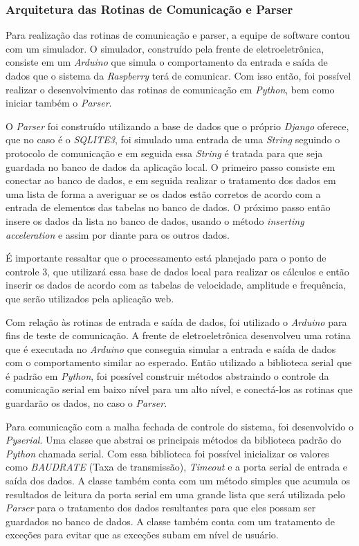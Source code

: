 \subsubsection*{\textbf{Arquitetura das Rotinas de Comunicação e Parser}}

Para realização das rotinas de comunicação e parser, a equipe de software contou com um simulador. O simulador, construído pela frente de eletroeletrônica, 
consiste em um \textit{Arduino} que simula o comportamento da entrada e saída de dados que o sistema da \textit{Raspberry} terá de comunicar. Com isso 
então, foi possível realizar o desenvolvimento das rotinas de comunicação em \textit{Python}, bem como iniciar também o \textit{Parser}.

O \textit{Parser} foi construído utilizando a base de dados que o próprio \textit{Django} oferece, que no caso é o \textit{SQLITE3}, foi simulado uma 
entrada de uma \textit{String} seguindo o protocolo de comunicação e em seguida essa \textit{String} é tratada para que seja guardada no banco de dados 
da aplicação local. O primeiro passo consiste em conectar ao banco de dados, e em seguida realizar o tratamento dos dados em uma lista de forma a 
averiguar se os dados estão corretos de acordo com a entrada de elementos das tabelas no banco de dados. O próximo passo então insere os dados da lista 
no banco de dados, usando o método \textit{inserting acceleration} e assim por diante para os outros dados.

É importante ressaltar que o processamento está planejado para o ponto de controle 3, que utilizará essa base de dados local para realizar os cálculos 
e então inserir os dados de acordo com as tabelas de velocidade, amplitude e frequência, que serão utilizados pela aplicação web.

Com relação às rotinas de entrada e saída de dados, foi utilizado o \textit{Arduino} para fins de teste de comunicação. A frente de eletroeletrônica 
desenvolveu uma rotina que é executada no \textit{Arduino} que conseguia simular a entrada e saída de dados com o comportamento similar ao esperado. 
Então utilizado a biblioteca serial que é padrão em \textit{Python}, foi possível construir métodos abstraindo o controle da comunicação serial em baixo
nível para um alto nível, e conectá-los as rotinas que guardarão os dados, no caso o \textit{Parser}.

Para comunicação com a malha fechada de controle do sistema, foi desenvolvido o \textit{Pyserial}. Uma classe que abstrai os principais métodos da 
biblioteca padrão do \textit{Python} chamada serial. Com essa biblioteca foi possível inicializar os valores como \textit{BAUDRATE} (Taxa de transmissão),
\textit{Timeout} e a porta serial de entrada e saída dos dados. A classe também conta com um método simples que acumula os resultados de leitura da porta 
serial em uma grande lista que será utilizada pelo \textit{Parser} para o tratamento dos dados resultantes para que eles possam ser guardados no banco de 
dados. A classe também conta com um tratamento de exceções para evitar que as exceções subam em nível de usuário.

